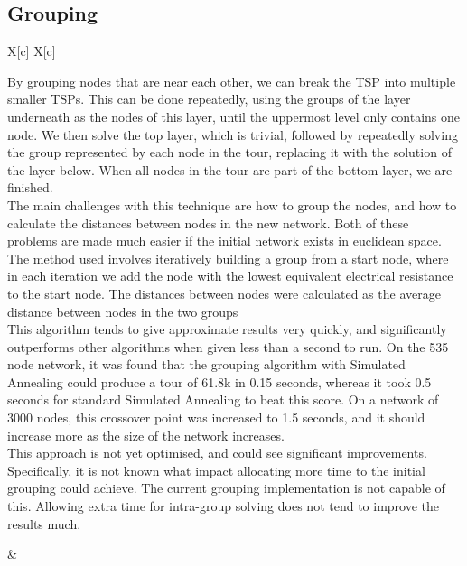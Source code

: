 \documentclass[a4paper, 11pt,table]{article}
\begin{document}
\subsection{Grouping}
\begin{tabu}{X[c] X[c]}
	\begin{minipage}{\linewidth}
By grouping nodes that are near each other, we can break the TSP into multiple smaller TSPs. This can be done repeatedly, using the groups of the layer underneath as the nodes of this layer, until the uppermost level only contains one node. We then solve the top layer, which is trivial, followed by repeatedly solving the group represented by each node in the tour, replacing it with the solution of the layer below. When all nodes in the tour are part of the bottom layer, we are finished.\\

The main challenges with this technique are how to group the nodes, and how to calculate the distances between nodes in the new network. Both of these problems are made much easier if the initial network exists in euclidean space. The method used involves iteratively building a group from a start node, where in each iteration we add the node with the lowest equivalent electrical resistance to the start node. The distances between nodes were calculated as the average distance between nodes in the two groups\\

This algorithm tends to give approximate results very quickly, and significantly outperforms other algorithms when given less than a second to run. On the 535 node network, it was found that the grouping algorithm with Simulated Annealing could produce a tour of 61.8k in 0.15 seconds, whereas it took 0.5 seconds for standard Simulated Annealing to beat this score. On a network of 3000 nodes, this crossover point was increased to 1.5 seconds, and it should increase more as the size of the network increases.\\

This approach is not yet optimised, and could see significant improvements. Specifically, it is not known what impact allocating more time to the initial grouping could achieve. The current grouping implementation is not capable of this. Allowing extra time for intra-group solving does not tend to improve the results much.\\
	\end{minipage}&

\begin{minipage}{\linewidth}
	\begin{center}
\end{center}
\end{minipage}
\end{tabu}
\end{document}
